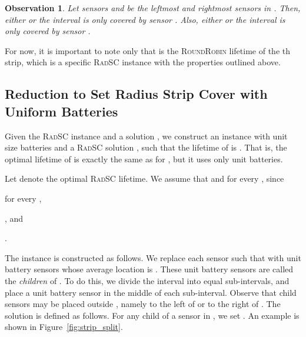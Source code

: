 \documentclass[11pt]{article}
\newtheorem{observation}[lemma]{Observation}
\newcommand{\srsc}{\textsc{RadSC}\xspace}
\newcommand{\rr}{\textsc{RoundRobin}\xspace}
\begin{document}
\begin{observation}
\label{obs:annoying}
Let sensors  and  be the leftmost and rightmost sensors in
.  Then, either  or the interval
 is only covered by sensor .  Also, either
 or the interval  is only
covered by sensor .
\end{observation}



For now, it is important to note only that  is the \rr lifetime of the th strip,
which is a specific \srsc instance  with the properties outlined
above.


\iffalse 

\begin{proof}
The theorem now follows from the upper bound and
Lemmas~\ref{lemma:dror}, \ref{lemma:strip_all}, and
\ref{lemma:strip_split}.  Suppose to the contrary that .  Then there must exist some strip  in which .  By Lemma~\ref{lemma:strip_split},
, while .  However, by Lemma~\ref{lemma:dror}, .  Thus, 

a contradiction.  Finally, Lemma \ref{lemma:strip_all} implies that
. 
\end{proof}

\fi 





\subsection{Reduction to Set Radius Strip Cover with Uniform Batteries}

Given the \srsc instance  and a solution , we
construct an instance  with unit size
batteries and a \srsc solution , such that the lifetime of
 is . That is, the optimal lifetime of  is
exactly the same as for , but it uses only unit batteries.

Let  denote the optimal \srsc lifetime.  We assume that  and  for every , since
\begin{inparaenum}[(i)]
\item  for every ,
\item , and
\item .
\end{inparaenum}

The instance  is constructed as follows.  We replace each sensor
 such that  with  unit battery sensors whose
average location is .  These unit battery sensors are called the
\emph{children} of .  To do this, we divide the interval  into  equal sub-intervals, and
place a unit battery sensor in the middle of each sub-interval.
Observe that child sensors may be placed outside , namely to
the left of  or to the right of .
The solution  is defined as follows.  For any child  of a
sensor  in , we set .  An example
is shown in Figure~\ref{fig:strip_split}.
\end{document}

